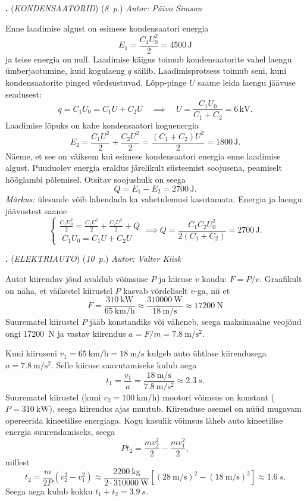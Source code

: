 \documentclass[11pt,a5paper]{article}
\newcommand{\numb}[1]{\vspace{5pt}\textbf{\large #1}}
\newcommand{\nimi}[1]{(\textsl{\small #1})}
\newcommand{\punktid}[1]{(\emph{#1~p.})}
\newcounter{ylesanne}
\newcommand{\yl}[1]{\addtocounter{ylesanne}{1}\numb{\theylesanne.} \nimi{#1} \newblock{}}
\newcommand{\autor}[1]{\emph{ Autor: #1}}%
\begin{document}
\yl{KONDENSAATORID}
\punktid{8} \autor{Päivo Simson}

Enne laadimise algust on esimese kondensaatori energia
\[E_1=\frac{C_1U_0^2}{2}=4500\,\textrm{J}\]
ja teise energia on null. Laadimise käigus toimub kondensaatorite vahel laengu ümberjaotumine, kuid kogulaeng $q$ säilib. Laadimisprotsess toimub seni, kuni kondensaatorite pinged võrdsustuvad. Lõpp-pinge $U$ saame leida laengu jäävuse seadusest:
\[q=C_1U_0=C_1U+C_2U\quad\implies\quad U=\frac{C_1U_0}{C_1+C_2}=6\,\textrm{kV}.\]
Laadimise lõpuks on kahe kondensaatori koguenergia
\[E_2=\frac{C_1U^2}{2}+\frac{C_2U^2}{2}=\frac{(C_1+C_2)U^2}{2}=1800\,\textrm{J}.\]
Näeme, et see on väiksem kui esimese kondensaatori energia enne laadimise algust. Puuduolev energia eraldus järelikult süsteemist soojusena, peamiselt hõõglambi põlemisel. Otsitav soojushulk on seega
\[Q=E_1-E_2=2700\,\textrm{J}.\]
\emph{Märkus:} ülesande võib lahendada ka vahetulemusi kasutamata. Energia ja laengu jäävustest saame
\[
\begin{cases}
\displaystyle\frac{C_1U_0^2}{2}=\frac{C_1U^2}{2}+\frac{C_2U^2}{2}+Q\\
\,\,C_1U_0=C_1U+C_2U
\end{cases}
\implies Q=\frac{C_1C_2U_0^2}{2(C_1+C_2)}=2700\,\textrm{J}.
\]

\yl{ELEKTRIAUTO}
\punktid{10} \autor{Valter Kiisk}

\osa Autot kiirendav jõud avaldub võimsuse $P$ ja kiiruse $v$ kaudu: $F=P/v$. Graafikult on näha, et väikestel kiirustel $P$ kasvab võrdeliselt $v$-ga, nii et
\[
F=\frac{\SI{310}{\kilo\watt}}{\SI{65}{\kilo\meter\per\hour}}
\approx\frac{\SI{310000}{\watt}}{\SI{18}{\meter\per\second}}\approx\SI{17200}{\newton}
\]
Suurematel kiirustel $P$ jääb konstandiks või väheneb, seega maksimaalne veojõud ongi \SI{17200}{N} ja vastav kiirendus $a=F/m=\SI{7.8}{\meter\per\second\squared}$.

\osa Kuni kiiruseni $v_1=\SI{65}{\kilo\meter\per\hour}=\SI{18}{\meter\per\second}$ kulgeb auto ühtlase kiirendusega $a=\SI{7.8}{\meter\per\second\squared}$. Selle kiiruse saavutamiseks kulub aega
\[
t_1=\frac{v_1}{a}= \frac{\SI{18}{\meter\per\second}}{\SI{7.8}{\meter\per\second\squared}} \approx \SI{2.3}{s}.
\]
Suurematel kiirustel (kuni $v_2=\SI{100}{\kilo\meter\per\hour}$) mootori võimsus on konstant ($P=\SI{310}{\kilo\watt}$), seega kiirendus ajas muutub. Kiirenduse asemel on nüüd mugavam opereerida kineetilise energiaga. Kogu kasulik võimsus läheb auto kineetilise energia suurendamiseks, seega
\[
Pt_2=\frac{mv_2^2}{2} - \frac{mv_1^2}{2},
\]
millest
\[
t_2=\frac{m}{2P}(v_2^2-v_1^2)\approx \frac{\SI{2200}{\kilo\gram}}{2\cdot \SI{310000}{\watt}}\left[(\SI{28}{\meter\per\second})^2 - (\SI{18}{\meter\per\second})^2 \right]\approx \SI{1.6}{s}.
\]
Seega aega kulub kokku $t_1+t_2=\SI{3.9}{s}$.
\end{document}

